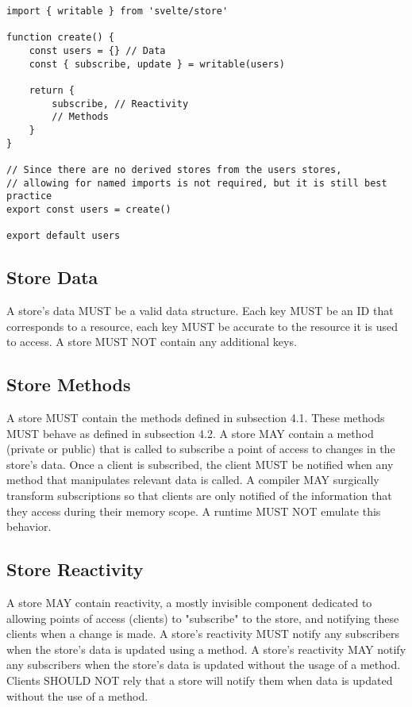 \documentclass{article}
\begin{document}
\begin{lstlisting}[caption={Data, Reactivity, and Methods}]
import { writable } from 'svelte/store'

function create() {
    const users = {} // Data
    const { subscribe, update } = writable(users)
    
    return {
        subscribe, // Reactivity
        // Methods
    }
}

// Since there are no derived stores from the users stores,
// allowing for named imports is not required, but it is still best practice
export const users = create()

export default users
\end{lstlisting}

\subsection{Store Data}
A store's data MUST be a valid data structure. Each key MUST be an ID that corresponds to a resource, each key MUST be accurate to the resource it is used to access. A store MUST NOT contain any additional keys.

\subsection{Store Methods}
A store MUST contain the methods defined in subsection 4.1. These methods MUST behave as defined in subsection 4.2. A store MAY contain a method (private or public) that is called to subscribe a point of access to changes in the store's data. Once a client is subscribed, the client MUST be notified when any method that manipulates relevant data is called. A compiler MAY surgically transform subscriptions so that clients are only notified of the information that they access during their memory scope. A runtime MUST NOT emulate this behavior.

\subsection{Store Reactivity}
A store MAY contain reactivity, a mostly invisible component dedicated to allowing points of access (clients) to "subscribe" to the store, and notifying these clients when a change is made. A store's reactivity MUST notify any subscribers when the store's data is updated using a method. A store's reactivity MAY notify any subscribers when the store's data is updated without the usage of a method. Clients SHOULD NOT rely that a store will notify them when data is updated without the use of a method.
\end{document}
